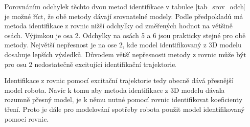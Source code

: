 Porovnáním odchylek těchto dvou metod identifikace v tabulce \ref{tab_srov_odch} je možné říct, že obě metody dávají srovnatelné modely. Podle předpokladů má metoda identifikace z rovnic nižší odchylky od změřených hodnot na většině osách. Výjimkou je osa 2. Odchylky na osách 5 a 6 jsou prakticky stejné pro obě metody. Největší nepřesnost je na ose 2, kde model identifikovaný z 3D modelu dosahuje lepších výsledků. Důvodem větší nepřesnosti metody z rovnic může být pro osu 2 nedostatečně excitující identifikační trajektorie.

Identifikace z rovnic pomocí excitační trajektorie tedy obecně dává přesnější model robota. Navíc k tomu aby metoda identifikace z 3D modelu dávala rozumně přesný model, je k němu nutné pomocí rovnic identifikovat koeficienty tření. Proto je dále pro modelování spotřeby robota použit model identifikovaný pomocí rovnic.